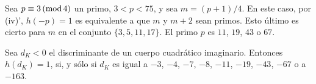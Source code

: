Sea $p\equiv 3\,(\rm{mod}\,4)$ un primo, $3<p<75$, y sea $m=(p+1)/4$. En este caso,
por (iv)', $h(-p)=1$ es equivalente a que $m$ y $m+2$ sean primos. Esto \'{u}ltimo
es cierto para $m$ en el conjunto $\{3,5,11,17\}$. El primo $p$ es
$11$, $19$, $43$ o $67$.

\begin{teoStarkHeegner}\label{thm:teoStarkHeegner}
 Sea $d_{K}<0$ el discriminante de un cuerpo cuadr\'{a}tico imaginario. Entonces
 $h(d_{K})=1$, si, y s\'{o}lo si $d_{K}$ es igual a $-3$, $-4$, $-7$, $-8$, $-11$,
 $-19$, $-43$, $-67$ o a $-163$.
\end{teoStarkHeegner}
